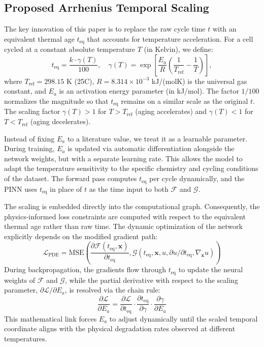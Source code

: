 \documentclass[conference]{IEEEtran}
\begin{document}
\subsection{Proposed Arrhenius Temporal Scaling}
The key innovation of this paper is to replace the raw cycle time \(t\) with an equivalent thermal age \(t_{\text{eq}}\) that accounts for temperature acceleration. For a cell cycled at a constant absolute temperature \(T\) (in Kelvin), we define:
\[
t_{\text{eq}} = \frac{k \cdot \gamma(T)}{100}, \quad 
\gamma(T) = \exp\left[\frac{E_a}{R}\left(\frac{1}{T_{\text{ref}}} - \frac{1}{T}\right)\right],
\]
where \(T_{\text{ref}} = 298.15\) K (25\textdegree C), \(R = 8.314 \times 10^{-3}\) kJ/(mol\textperiodcentered K) is the universal gas constant, and \(E_a\) is an activation energy parameter (in kJ/mol). The factor \(1/100\) normalizes the magnitude so that \(t_{\text{eq}}\) remains on a similar scale as the original \(t\). The scaling factor \(\gamma(T) > 1\) for \(T > T_{\text{ref}}\) (aging accelerates) and \(\gamma(T) < 1\) for \(T < T_{\text{ref}}\) (aging decelerates).

Instead of fixing \(E_a\) to a literature value, we treat it as a learnable parameter. During training, \(E_a\) is updated via automatic differentiation alongside the network weights, but with a separate learning rate. This allows the model to adapt the temperature sensitivity to the specific chemistry and cycling conditions of the dataset. The forward pass computes \(t_{\text{eq}}\) per cycle dynamically, and the PINN uses \(t_{\text{eq}}\) in place of \(t\) as the time input to both \(\mathcal{F}\) and \(\mathcal{G}\).

The scaling is embedded directly into the computational graph. Consequently, the physics-informed loss constraints are computed with respect to the equivalent thermal age rather than raw time. The dynamic optimization of the network explicitly depends on the modified gradient path:
\[
\mathcal{L}_{\text{PDE}} = \text{MSE}\left(\frac{\partial \mathcal{F}(t_{\text{eq}}, \mathbf{x})}{\partial t_{\text{eq}}}, \mathcal{G}(t_{\text{eq}}, \mathbf{x}, u, \partial u / \partial t_{\text{eq}}, \nabla_{\mathbf{x}} u)\right)
\]
During backpropagation, the gradients flow through $t_{\text{eq}}$ to update the neural weights of \(\mathcal{F}\) and \(\mathcal{G}\), while the partial derivative with respect to the scaling parameter, \(\partial \mathcal{L} / \partial E_a\), is resolved via the chain rule:
\[
\frac{\partial \mathcal{L}}{\partial E_a} = \frac{\partial \mathcal{L}}{\partial t_{\text{eq}}} \cdot \frac{\partial t_{\text{eq}}}{\partial \gamma} \cdot \frac{\partial \gamma}{\partial E_a}
\]
This mathematical link forces $E_a$ to adjust dynamically until the scaled temporal coordinate aligns with the physical degradation rates observed at different temperatures.
\end{document}
